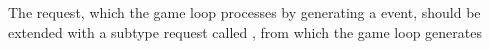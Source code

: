 The  request, which the game loop processes by generating
a  event, should be extended with a subtype request called
, from which the game loop generates
